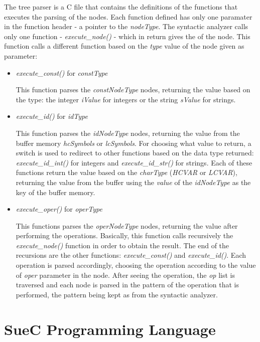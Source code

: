 \documentclass[12pt,a4paper,twoside]{report}
\begin{document}
The tree parser is a C file that contains the definitions of the functions that executes the parsing of the nodes. Each function defined has only one paramater in the function header - a pointer to the \textit{nodeType}. The syntactic analyzer calls only one function - \textit{execute\_node()} - which in return gives the of the node. This function calls a different function based on the \textit{type} value of the node given as parameter:

\begin{itemize}
	\item \textit{execute\_const()} for \textit{constType}
	
	This function parses the \textit{constNodeType} nodes, returning the value based on the type: the integer \textit{iValue} for integers or the string \textit{sValue} for strings. 
	
	\item \textit{execute\_id()} for \textit{idType}
	
	This function parses the \textit{idNodeType} nodes, returning the value from the buffer memory \textit{hcSymbols} or \textit{lcSymbols}. For choosing what value to return, a switch is used to redirect to other functions based on the data type returned: \textit{execute\_id\_int()} for integers and \textit{execute\_id\_str()} for strings. Each of these functions return the value based on the \textit{charType} (\textit{HCVAR} or \textit{LCVAR}), returning the value from the buffer using the \textit{value} of the \textit{idNodeType} as the key of the buffer memory. 
	
	\item \textit{execute\_oper()} for \textit{operType}
	
	This functions parses the \textit{operNodeType} nodes, returning the value after performing the operations. Basically, this function calls recursively the \textit{execute\_node()} function in order to obtain the result. The end of the recursions are the other functions: \textit{execute\_const()} and \textit{execute\_id()}. Each operation is parsed accordingly, choosing the operation according to the value of \textit{oper} parameter in the node. After seeing the operation, the \textit{op} list is traversed and each node is parsed in the pattern of the operation that is performed, the pattern being kept as from the syntactic analyzer.  
\end{itemize}


\section{SueC Programming Language}
\end{document}
